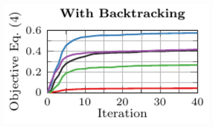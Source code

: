 \begin{figure}[t]%
    \vspace*{-1px}
    
    \begin{minipage}[t]{0.235\textwidth}
        \vspace*{-4px}
        
        \includegraphics[width=1\textwidth]{fig_msvhn_attack_error_advtrain_0}
    \end{minipage}
    \begin{minipage}[t]{0.235\textwidth}
        \vspace*{-4px}
        

\end{minipage}
\end{figure}
